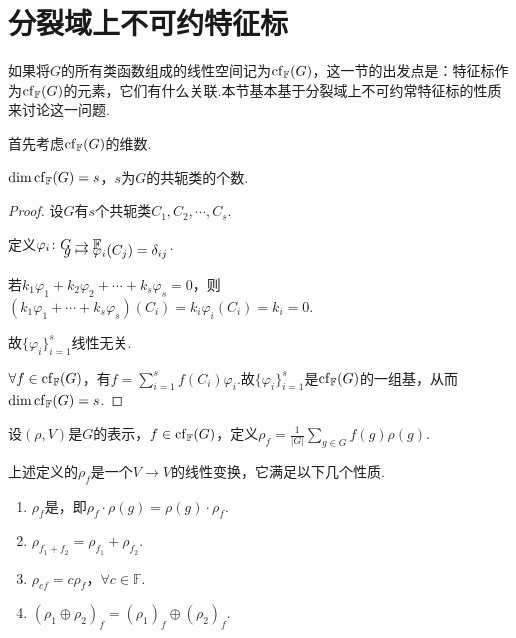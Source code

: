 \section{分裂域上不可约特征标}

如果将$G$的所有类函数组成的线性空间记为$\operatorname{cf}_{\mathbb{F}}(G)$，这一节的出发点是：特征标作为$\operatorname{cf}_{\mathbb{F}}(G)$的元素，它们有什么关联.本节基本基于分裂域上不可约常特征标的性质来讨论这一问题.\par

首先考虑$\operatorname{cf}_{\mathbb{F}}(G)$的维数.

\begin{lemma}[]
    $\dim \operatorname{cf}_{\mathbb{F}}(G) = s$，$s$为$G$的共轭类的个数.
\end{lemma}

\begin{proof}
    设$G$有$s$个共轭类$C_1,C_2,\cdots,C_s$.\par
    定义$\setjot[-8]\begin{aligned}[t]
        \varphi_i\colon G &\to \mathbb{F} \\
        g &\mapsto \varphi_i(C_j)=\delta_{ij}
    \end{aligned} $.\par
    若$k_1\varphi_1+k_2\varphi_2+\cdots+k_s\varphi_s=0$，则$(k_1\varphi_1+\cdots+k_s\varphi_s)(C_i)=k_i\varphi_i(C_i)=k_i=0$.\par
    故$\{\varphi_i\}_{i=1}^s$线性无关.\par
    $\forall f\in \operatorname{cf}_{\mathbb{F}}(G)$，有$f=\sum_{i=1}^s f(C_i)\varphi_i$.故$\{\varphi_i\}_{i=1}^s$是$\operatorname{cf}_{\mathbb{F}}(G)$的一组基，从而$\dim \operatorname{cf}_{\mathbb{F}}(G)=s$.
\end{proof}

\begin{definition}[]
    设$(\rho,V)$是$G$的表示，$f\in \operatorname{cf}_{\mathbb{F}}(G)$，定义$\rho_f = \frac{1}{|G|}\sum_{g\in G}f(g)\rho(g)$.
\end{definition}

上述定义的$\rho_f$是一个$V\to V$的线性变换，它满足以下几个性质.

\begin{property}[]
    \begin{enumerate}
        \item $\rho_f$是\ghomo，即$\rho_f\cdot\rho(g)=\rho(g)\cdot\rho_f$.
        \item $\rho_{f_1+f_2}=\rho_{f_1}+\rho_{f_2}$.
        \item $\rho_{cf}=c\rho_f$，$\forall c\in \mathbb{F}$.
        \item $(\rho_1\oplus\rho_2)_f=(\rho_1)_f\oplus(\rho_2)_f$.
    \end{enumerate}
\end{property}

